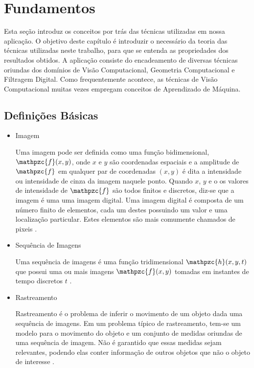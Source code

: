 \chapter{Fundamentos\label{chap:FundamentacaoMatematica}}

Esta seção introduz os conceitos por trás das técnicas utilizadas em nossa
aplicação. O objetivo deste capítulo é introduzir o necessário da teoria das técnicas utilizadas neste trabalho, para que se entenda as propriedades dos resultados obtidos. A
aplicação consiste do encadeamento de diversas técnicas oriundas dos domínios de 
Visão Computacional, Geometria Computacional e Filtragem Digital. Como
frequentemente acontece, as técnicas de Visão Computacional muitas vezes
empregam conceitos de Aprendizado de Máquina. 


\section{Definições Básicas}

\begin{itemize}
\item Imagem

Uma imagem pode ser definida como uma função bidimensional, $\mathpzc{f}(x,y)$, onde $x$ e $y$ são coordenadas espaciais e a amplitude de $\mathpzc{f}$ em qualquer par de coordenadas $(x,y)$ é dita a intensidade ou intensidade de cinza da imagem naquele ponto. Quando $x$, $y$ e o os valores de intensidade de $\mathpzc{f}$ são todos finitos e discretos, diz-se que a imagem é uma uma imagem digital. Uma imagem digital é composta de um número finito de elementos, cada um destes possuindo um valor e uma localização particular. Estes elementos são mais comumente chamados de pixeis \cite{gonzalesDigitalImageProc}.

\item Sequência de Imagens

Uma sequência de imagens é uma função tridimensional $\mathpzc{h}(x,y,t)$ que possui uma ou mais imagens $\mathpzc{f}(x,y)$ tomadas em instantes de tempo discretos $t$ \cite{def:imageSequence}.

\item Rastreamento

Rastreamento é o problema de inferir o movimento de um objeto dada uma sequência de imagens. Em um problema típico de rastreamento, tem-se um modelo para o movimento do objeto e um conjunto de medidas oriundas de uma sequência de imagem. Não é garantido que essas medidas sejam relevantes, podendo elas conter informação de outros objetos que não o objeto de interesse \cite{computer-vision-modern-approach-forsithy}.

\end{itemize}


